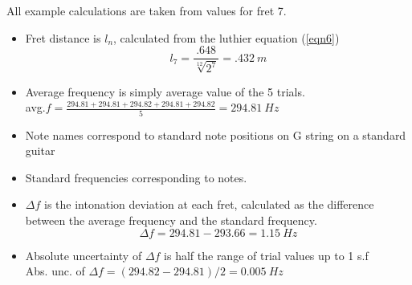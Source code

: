 All example calculations are taken from values for fret 7.
\begin{itemize}
    \item Fret distance is $l_n$, calculated from the luthier equation (\ref{eqn6})
    $$l_7 = \frac{.648}{\sqrt[12]{2^7}} = \SI{.432}{m}$$
    \item Average frequency is simply average value of the 5 trials.\\
    avg.$f = \frac{294.81 + 294.81 + 294.82 + 294.81 + 294.82 }{5} = \SI{294.81}{Hz}$
    \item Note names correspond to standard note positions on G string on a standard guitar
    \item Standard frequencies corresponding to notes. \cite{freq_chart} 
    \item $\Delta f$ is the intonation deviation at each fret, calculated as the difference between the average frequency and the standard frequency.
    $$\Delta f = 294.81 - 293.66 = \SI{1.15}{Hz}$$
    \item Absolute uncertainty of $\Delta f$ is half the range of trial values up to 1 s.f \\
    Abs. unc. of $\Delta f = (294.82-294.81)/2 = \SI{0.005}{Hz}$
\end{itemize}